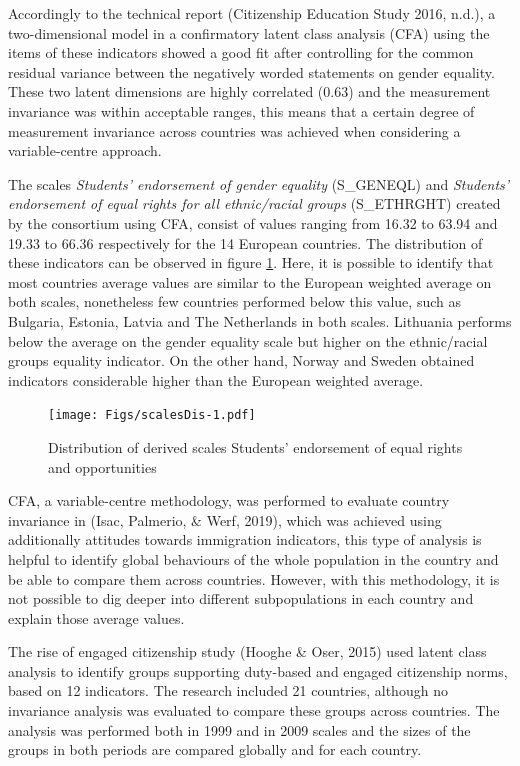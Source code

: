 \documentclass[12pt,a4paper,oneside]{reedthesis}
\begin{document}
Accordingly to the technical report (Citizenship Education Study 2016, n.d.), a two-dimensional model in a confirmatory latent class analysis (CFA) using the items of these indicators showed a good fit after controlling for the common residual variance between the negatively worded statements on gender equality. These two latent dimensions are highly correlated (0.63) and the measurement invariance was within acceptable ranges, this means that a certain degree of measurement invariance across countries was achieved when considering a variable-centre approach.

The scales \emph{Students' endorsement of gender equality} (S\_GENEQL) and \emph{Students' endorsement of equal rights for all ethnic/racial groups} (S\_ETHRGHT) created by the consortium using CFA, consist of values ranging from 16.32 to 63.94 and 19.33 to 66.36 respectively for the 14 European countries. The distribution of these indicators can be observed in figure \ref{fig:scalesDis}. Here, it is possible to identify that most countries average values are similar to the European weighted average on both scales, nonetheless few countries performed below this value, such as Bulgaria, Estonia, Latvia and The Netherlands in both scales. Lithuania performs below the average on the gender equality scale but higher on the ethnic/racial groups equality indicator. On the other hand, Norway and Sweden obtained indicators considerable higher than the European weighted average.
\begin{figure}
\centering
\texttt{[image: Figs/scalesDis-1.pdf]}
\caption{\label{fig:scalesDis}Distribution of derived scales Students' endorsement of equal rights and opportunities}
\end{figure}
CFA, a variable-centre methodology, was performed to evaluate country invariance in (Isac, Palmerio, \& Werf, 2019), which was achieved using additionally attitudes towards immigration indicators, this type of analysis is helpful to identify global behaviours of the whole population in the country and be able to compare them across countries. However, with this methodology, it is not possible to dig deeper into different subpopulations in each country and explain those average values.

The rise of engaged citizenship study (Hooghe \& Oser, 2015) used latent class analysis to identify groups supporting duty-based and engaged citizenship norms, based on 12 indicators. The research included 21 countries, although no invariance analysis was evaluated to compare these groups across countries. The analysis was performed both in 1999 and in 2009 scales and the sizes of the groups in both periods are compared globally and for each country.
\end{document}
